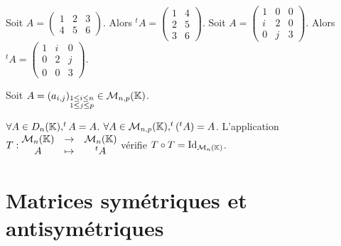 \documentclass[12pt, a4paper]{report}
\begin{document}
\begin{example}
    \begin{outline}
        \1 Soit $A = \left(\begin{matrix}
            1 & 2 & 3
            \\
            4 & 5 & 6
        \end{matrix}\right)$. Alors $^tA = \left(\begin{matrix}
            1 & 4
            \\
            2 & 5
            \\
            3 & 6
        \end{matrix}\right)$.
        \1 Soit $A = \left(\begin{matrix}
            1 & 0 & 0
            \\
            i & 2 & 0
            \\
            0 & j & 3
        \end{matrix}\right)$. Alors $^tA = \left(\begin{matrix}
            1 & i & 0
            \\
            0 & 2 & j
            \\
            0 & 0 & 3
        \end{matrix}\right)$.
    \end{outline}
\end{example}

\begin{remark}
    Soit $A = (a_{i,j})_{\substack{1 \leq i \leq n\\ 1\leq j \leq p}} \in \mathcal M_{n,p}(\mathbb{K})$.
    
    \begin{outline}[enumerate]
        \1 $\forall A \in D_n(\mathbb{K}), ^tA = A$.
        \1 $\forall A \in \mathcal M_{n,p}(\mathbb{K}), ^t(^tA) = A$.
        \1 L'application $T : \begin{matrix} \mathcal M_{n}(\mathbb{K}) &\to &\mathcal M_{n}(\mathbb{K}) \\ A &\mapsto &^tA \end{matrix}$ vérifie $T\circ T=\mathrm{Id}_{\mathcal M_n(\mathbb{K})}$.
    \end{outline}
\end{remark}

\section{Matrices symétriques et antisymétriques}
\end{document}
